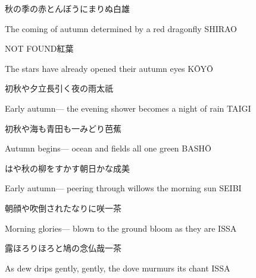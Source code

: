 \begin{haiku}
    {\FH 秋の季の赤とんぼうにまりぬ}\hfill{\FH 白雄}

    \vin{} The coming of autumn
    \vin{} \vin{} determined
    \vin{} \vin{} \vin{} by a red dragonfly \hspace{\fill} SHIRAO
\end{haiku}

\begin{haiku}
    {NOT FOUND}\hfill{\FH 紅葉}

    \vin{} The stars
    \vin{} \vin{} have already opened
    \vin{} \vin{} \vin{} their autumn eyes \hspace{\fill} K\={O}Y\={O}
\end{haiku}

\begin{haiku}
    {\FH 初秋や夕立長引く夜の雨}\hfill{\FH 太祇}

    \vin{} Early autumn---
    \vin{} \vin{} the evening shower becomes
    \vin{} \vin{} \vin{} a night of rain \hspace{\fill} TAIGI
\end{haiku}

\begin{haiku}
    {\FH 初秋や海も青田も一みどり}\hfill{\FH 芭蕉}

    \vin{} Autumn begins---
    \vin{} \vin{} ocean and fields
    \vin{} \vin{} \vin{} all one green \hspace{\fill} BASH\={O}
\end{haiku}

\begin{haiku}
    {\FH はや秋の柳をすかす朝日かな}\hfill{\FH 成美}

    \vin{} Early autumn---
    \vin{} \vin{} peering through willows
    \vin{} \vin{} \vin{} the morning sun \hspace{\fill} SEIBI
\end{haiku}

\begin{haiku}
    {\FH 朝顔や吹倒されたなりに咲}\hfill{\FH 一茶}

    \vin{} Morning glories---
    \vin{} \vin{} blown to the ground
    \vin{} \vin{} \vin{} bloom as they are \hspace{\fill} ISSA
\end{haiku}

\begin{haiku}
    {\FH 露ほろりほろと鳩の念仏哉}\hfill{\FH 一茶}

    \vin{} As dew drips
    \vin{} \vin{} gently, gently, the dove
    \vin{} \vin{} \vin{} murmurs its chant \hspace{\fill} ISSA
\end{haiku}

